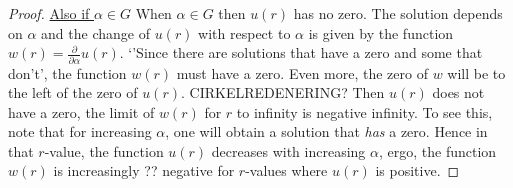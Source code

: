 \begin{lemma}
\begin{proof}
\seperate

\underline{Also if $\alpha\in G$}
When $\alpha\in G$ then $u(r)$ has no zero.
The solution depends on $\alpha$ and the change of $u(r)$ with respect to $\alpha$ is given by
the function $w(r)=\frac{\partial}{\partial\alpha}u(r)$.
`'Since there are solutions that have a zero and some that don't',
the function $w(r)$ must have a zero.
Even more, the zero of $w$ will be to the left of the zero of $u(r)$.
CIRKELREDENERING?
Then $u(r)$ does not have a zero, the limit of $w(r)$ for $r$ to infinity is negative infinity.
To see this, note that for increasing $\alpha$, one will obtain a solution that \emph{has} a zero.
Hence in that $r$-value, the function $u(r)$ decreases with increasing $\alpha$, ergo,
the function $w(r)$ is increasingly ?? negative for $r$-values where $u(r)$ is positive.

\seperate

\end{proof}
\end{lemma}
